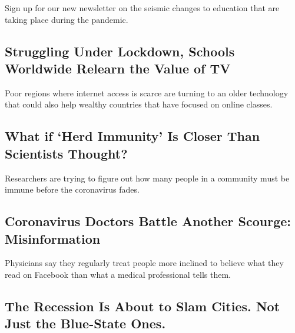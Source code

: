 Sign up for our new newsletter on the seismic changes to education that
are taking place during the pandemic.

\href{/2020/08/17/world/coronavirus-television-schools.html}{}

\hypertarget{struggling-under-lockdown-schools-worldwide-relearn-the-value-of-tv}{%
\subsection{Struggling Under Lockdown, Schools Worldwide Relearn the
Value of
TV}\label{struggling-under-lockdown-schools-worldwide-relearn-the-value-of-tv}}

Poor regions where internet access is scarce are turning to an older
technology that could also help wealthy countries that have focused on
online classes.

\href{/2020/08/17/health/coronavirus-herd-immunity.html}{}

\hypertarget{what-if-herd-immunity-is-closer-than-scientists-thought}{%
\subsection{What if `Herd Immunity' Is Closer Than Scientists
Thought?}\label{what-if-herd-immunity-is-closer-than-scientists-thought}}

Researchers are trying to figure out how many people in a community must
be immune before the coronavirus fades.

\href{/2020/08/17/technology/coronavirus-disinformation-doctors.html}{}

\hypertarget{coronavirus-doctors-battle-another-scourge-misinformation}{%
\subsection{Coronavirus Doctors Battle Another Scourge:
Misinformation}\label{coronavirus-doctors-battle-another-scourge-misinformation}}

Physicians say they regularly treat people more inclined to believe what
they read on Facebook than what a medical professional tells them.

\href{/2020/08/17/upshot/pandemic-recession-cities-fiscal-shortfall.html}{}

\href{/2020/08/17/upshot/pandemic-recession-cities-fiscal-shortfall.html}{}

\hypertarget{the-recession-is-about-to-slam-cities-not-just-the-blue-state-ones}{%
\subsection{The Recession Is About to Slam Cities. Not Just the
Blue-State
Ones.}\label{the-recession-is-about-to-slam-cities-not-just-the-blue-state-ones}}

